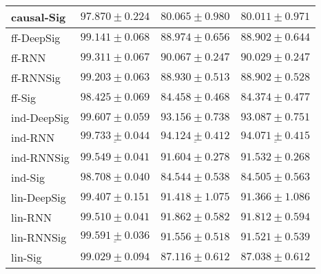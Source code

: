 \begin{tabular}{llll}
causal-Sig     &                           $ 97.870 \pm 0.224 $ &                           $ 80.065 \pm 0.980 $ &                           $ 80.011 \pm 0.971 $ \\
\midrule
ff-DeepSig     &                           $ 99.141 \pm 0.068 $ &                           $ 88.974 \pm 0.656 $ &                           $ 88.902 \pm 0.644 $ \\
ff-RNN         &                           $ 99.311 \pm 0.067 $ &                           $ 90.067 \pm 0.247 $ &                           $ 90.029 \pm 0.247 $ \\
ff-RNNSig      &                           $ 99.203 \pm 0.063 $ &                           $ 88.930 \pm 0.513 $ &                           $ 88.902 \pm 0.528 $ \\
ff-Sig         &                           $ 98.425 \pm 0.069 $ &                           $ 84.458 \pm 0.468 $ &                           $ 84.374 \pm 0.477 $ \\
\midrule
ind-DeepSig    &               $  \mathbf{ 99.607 \pm 0.059 } $ &               $  \mathbf{ 93.156 \pm 0.738 } $ &               $  \mathbf{ 93.087 \pm 0.751 } $ \\
ind-RNN        &  $  \mathbf{ \underline{ 99.733 \pm 0.044 }} $ &  $  \mathbf{ \underline{ 94.124 \pm 0.412 }} $ &  $  \mathbf{ \underline{ 94.071 \pm 0.415 }} $ \\
ind-RNNSig     &                           $ 99.549 \pm 0.041 $ &                           $ 91.604 \pm 0.278 $ &                           $ 91.532 \pm 0.268 $ \\
ind-Sig        &                           $ 98.708 \pm 0.040 $ &                           $ 84.544 \pm 0.538 $ &                           $ 84.505 \pm 0.563 $ \\
\midrule
lin-DeepSig    &                           $ 99.407 \pm 0.151 $ &                           $ 91.418 \pm 1.075 $ &                           $ 91.366 \pm 1.086 $ \\
lin-RNN        &                           $ 99.510 \pm 0.041 $ &                           $ 91.862 \pm 0.582 $ &                           $ 91.812 \pm 0.594 $ \\
lin-RNNSig     &            $  \underline{ 99.591 \pm 0.036 } $ &                           $ 91.556 \pm 0.518 $ &                           $ 91.521 \pm 0.539 $ \\
lin-Sig        &                           $ 99.029 \pm 0.094 $ &                           $ 87.116 \pm 0.612 $ &                           $ 87.038 \pm 0.612 $ \\

\end{tabular}
